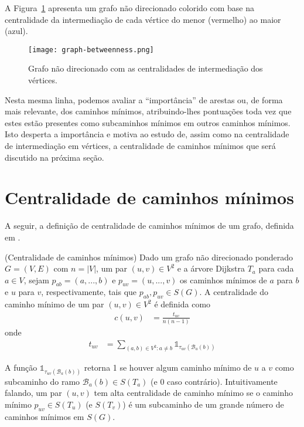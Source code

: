 A Figura~\ref{sec3:graph-betweenness} apresenta um grafo não direcionado colorido com base na centralidade da intermediação de cada vértice do menor (vermelho) ao maior (azul).

\begin{figure}[!htb]
    \centering
    \texttt{[image: graph-betweenness.png]}
    \caption{Grafo não direcionado com as centralidades de intermediação dos vértices.}
    \label{sec3:graph-betweenness}
\end{figure}

Nesta mesma linha, podemos avaliar a ``importância'' de arestas ou, de forma mais relevante, dos caminhos mínimos, atribuindo-lhes pontuações toda vez que estes estão presentes como subcaminhos mínimos em outros caminhos mínimos. Isto desperta a importância e motiva ao estudo de, assim como na centralidade de intermediação em vértices, a centralidade de caminhos mínimos que será discutido na próxima seção.

\section{Centralidade de caminhos mínimos}
A seguir, a definição de centralidade de caminhos mínimos de um grafo, definida em \cite{alane2021}.

\begin{definition}
    (Centralidade de caminhos mínimos) Dado um grafo não direcionado ponderado $G = (V, E)$ com $n = |V|$, um par $(u, v) \in V^2$ e a árvore Dijkstra $T_a$ para cada $a \in V$, sejam $p_{ab} = (a,...,b)$ e $p_{uv} = (u,...,v)$ os caminhos mínimos de $a$ para $b$ e $u$ para $v$, respectivamente, tais que $p_{ab}, p_{uv} \in S(G)$. A centralidade do caminho mínimo de um par $(u, v) \in V^2$ é definida como
    \begin{align*}
        c(u, v) &= \frac{t_{uv}}{n(n - 1)}
    \end{align*}
    onde
    \begin{align*}
        t_{uv} &= \sum_{(a,b) \in V^2 : a \neq b} \mathbb{1}_{\tau_{uv}(\mathcal{B}_a(b))}
    \end{align*}
\end{definition}

A função $\mathbb{1}_{\tau_{uv}(\mathcal{B}_a(b))}$ retorna 1 se houver algum caminho mínimo de $u$ a $v$ como subcaminho do ramo $\mathcal{B}_a(b) \in S (T_a)$ (e 0 caso contrário). Intuitivamente falando, um par $(u, v)$ tem alta centralidade de caminho mínimo se o caminho mínimo $p_{uv} \in S(T_u)$ (e $S(T_v)$) é um subcaminho de um grande número de caminhos mínimos em $S(G)$.

